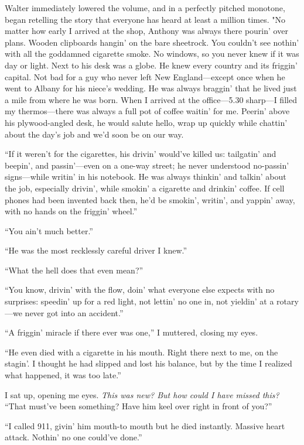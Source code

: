 Walter immediately lowered the volume, and in a perfectly pitched
monotone, began retelling the story that everyone has heard at least a
million times. "No matter how early I arrived at the shop, Anthony was
always there pourin' over plans. Wooden clipboards hangin' on the bare
sheetrock. You couldn't see nothin' with all the goddamned cigarette
smoke. No windows, so you never knew if it was day or light. Next to his
desk was a globe. He knew every country and its friggin' capital. Not
bad for a guy who never left New England---except once when he went to
Albany for his niece's wedding. He was always braggin' that he lived
just a mile from where he was born. When I arrived at the office---5.30
sharp---I filled my thermos---there was always a full pot of coffee
waitin' for me. Peerin' above his plywood-angled desk, he would salute
hello, wrap up quickly while chattin' about the day's job and we'd soon
be on our way.

``If it weren't for the cigarettes, his drivin' would've killed us:
tailgatin' and beepin', and passin'---even on a one-way street; he never
understood no-passin' signs---while writin' in his notebook. He was
always thinkin' and talkin' about the job, especially drivin', while
smokin' a cigarette and drinkin' coffee. If cell phones had been
invented back then, he'd be smokin', writin', and yappin' away, with no
hands on the friggin' wheel.''

``You ain't much better.''

``He was the most recklessly careful driver I knew.''

``What the hell does that even mean?''

``You know, drivin' with the flow, doin' what everyone else expects with
no surprises: speedin' up for a red light, not lettin' no one in, not
yieldin' at a rotary---we never got into an accident.''

``A friggin' miracle if there ever was one,'' I muttered, closing my
eyes.

``He even died with a cigarette in his mouth. Right there next to me, on
the stagin'. I thought he had slipped and lost his balance, but by the
time I realized what happened, it was too late.''

I sat up, opening me eyes. \emph{This was new? But how could I have
missed this?} ``That must've been something? Have him keel over right in
front of you?''

``I called 911, givin' him mouth-to mouth but he died instantly. Massive
heart attack. Nothin' no one could've done.''

